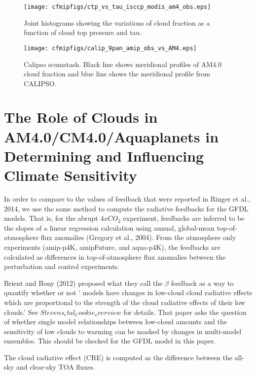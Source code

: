 \documentclass[11pt]{article}   	%
\begin{document}
\begin{figure}
  \texttt{[image: cfmipfigs/ctp\_vs\_tau\_isccp\_modis\_am4\_obs.eps]}
  \caption{Joint histograms showing the variations of cloud fraction as a function of cloud top pressure and tau.}
  \label{fig:calipso_sim_vs_mod}
\end{figure}

\begin{figure}
  \texttt{[image: cfmipfigs/calip\_9pan\_amip\_obs\_vs\_AM4.eps]}
  \caption{Calipso scumstash.  Black line shows meridional profiles of AM4.0 cloud fraction and blue line shows
  the meridional profile from CALIPSO.}
  \label{fig:calipso_9pan}
\end{figure}


\section{The Role of Clouds in AM4.0/CM4.0/Aquaplanets in Determining and Influencing Climate Sensitivity}

In order to compare to the values of feedback that were reported in Ringer et al., 2014, we use the same method 
to compute the radiative feedbacks for the GFDL models.  That is, for the abrupt $4xCO_{2}$ experiment, feedbacks are 
inferred to be the slopes of a linear regression calculation using annual, global-mean top-of-atmosphere flux anomalies 
(Gregory et al., 2004).  From the atmosphere only experiments (amip-p4K, amipFuture, and aqua-p4K), the feedbacks are calculated as 
differences in top-of-atmosphere flux anomalies between the perturbation and control experiments.   

Brient and Bony (2012) proposed what they call the $\beta$ feedback as a way to quantify whether or not ' models have 
changes in low-cloud cloud radiative effects which are proportional to the strength of the cloud radiative effects of their
low clouds.'  See $Stevens_etal_Cookie_overview$ for details.   That paper asks the question of whether single 
model relationships between low-cloud amounts and the sensitivity of low clouds to warming can be 
masked by changes in multi-model ensembles.  This should be checked for the GFDL model in this paper.  

The cloud radiative effect (CRE) is computed as the difference between the all-sky and clear-sky TOA fluxes.  
\end{document}
